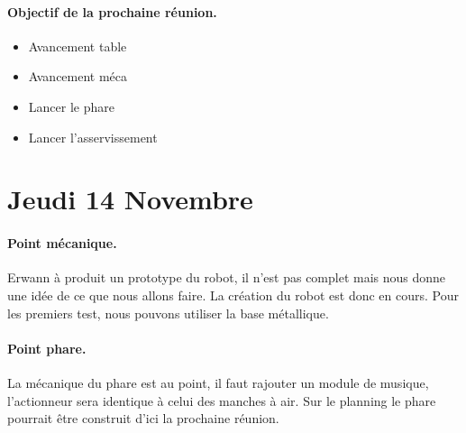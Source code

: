 \documentclass[a4paper,10pt]{report}
\begin{document}
\begin{spacing}{1.5}
\paragraph*{Objectif de la prochaine réunion.}
\begin{itemize}
	\item Avancement table
	\item Avancement méca
	\item Lancer le phare
	\item Lancer l'asservissement
\end{itemize}

\newpage
\section*{Jeudi 14 Novembre}
\paragraph*{Point mécanique.}
Erwann à produit un prototype du robot, il n'est pas complet mais nous donne une idée de ce que nous allons faire. La création du robot est donc en cours.
Pour les premiers test, nous pouvons utiliser la base métallique.

\paragraph*{Point phare.}
La mécanique du phare est au point, il faut rajouter un module de musique, l'actionneur sera identique à celui des manches à air.
Sur le planning le phare pourrait être construit d'ici la prochaine réunion.


\end{spacing}
\end{document}
